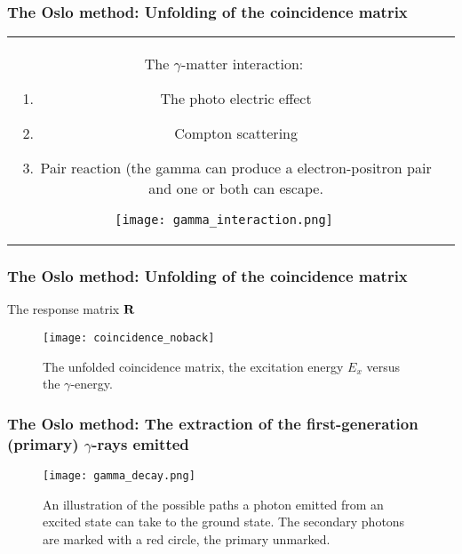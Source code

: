 \documentclass{beamer}              %
\begin{document}
\begin{frame}
\frametitle{The Oslo method:
Unfolding of the coincidence matrix}

\begin{tabular}{cc}
\begin{minipage}{0.5\textwidth}
The $\gamma$-matter interaction:
\begin{enumerate}
\item The photo electric effect
\item Compton scattering
\item Pair reaction (the gamma can produce a electron-positron pair and one or both can escape. 
\end{enumerate}
\end{minipage}

\begin{minipage}{0.5\textwidth}
\begin{figure}[htp]
\centering
\texttt{[image: gamma\_interaction.png]}
\label{fig: gamma_interaction}
\end{figure}
\end{minipage}

\end{tabular}
\end{frame}

\begin{frame}
\frametitle{The Oslo method: Unfolding of the coincidence matrix}
The response matrix $\bf R$
\begin{figure}[htp]
\centering
\texttt{[image: coincidence\_noback]}
\caption{The unfolded coincidence matrix, the excitation energy $E_x$ versus the $\gamma$-energy.}
\label{fig: un_coincidence}
\end{figure}
\end{frame}

\begin{frame}
\frametitle{The Oslo method: The extraction of the first-generation (primary) $\gamma$-rays emitted}


\begin{figure}[htp]
\centering
\texttt{[image: gamma\_decay.png]}
\caption{An illustration of the possible paths a photon emitted from an excited state can take to the ground state. The secondary photons are marked with a red circle, the primary unmarked.}
\label{fig: gamma_decay}
\end{figure}
\end{frame}
\end{document}
